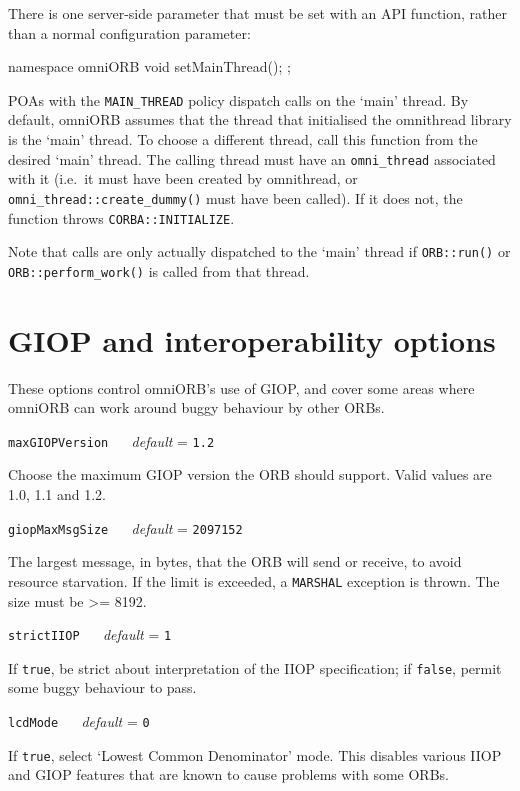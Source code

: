 \documentclass[11pt,oneside,a4paper]{book}
\makeatletter
\newcommand{\code}[1]{\texttt{#1}}
\newcommand{\op}[1]{\texttt{#1()}}
\newcommand{\confopt}[2]
  {\vspace{\baselineskip}\par\noindent\code{#1} ~~ \textit{default} =
   \code{#2}}
\renewcommand{\confopt}[2]
  {\vspace{\baselineskip}\par\noindent\code{#1} ~~ \textit{default} =
   \code{#2}\\[-1ex]\@afterheading}
\newcommand{\dsc}{\discretionary{}{}{}}
\makeatother
\begin{document}
There is one server-side parameter that must be set with an API
function, rather than a normal configuration parameter:

\begin{cxxlisting}
namespace omniORB {
  void setMainThread();
};
\end{cxxlisting}

\noindent
POAs with the \code{MAIN\_THREAD} policy dispatch calls on the `main'
thread.  By default, omniORB assumes that the thread that initialised
the omnithread library is the `main' thread. To choose a different
thread, call this function from the desired `main' thread. The calling
thread must have an \code{omni\_thread} associated with it (i.e.\ it
must have been created by omnithread, or
\op{omni\_thread::create\_\dsc{}dummy} must have been called). If it
does not, the function throws \code{CORBA::\dsc{}INITIALIZE}.
                                                                  
Note that calls are only actually dispatched to the `main' thread if
\op{ORB::run} or \op{ORB::perform\_work} is called from that thread.




\section{GIOP and interoperability options}

These options control omniORB's use of GIOP, and cover some areas
where omniORB can work around buggy behaviour by other ORBs.


\confopt{maxGIOPVersion}{1.2}

Choose the maximum GIOP version the ORB should support. Valid values
are 1.0, 1.1 and 1.2.


\confopt{giopMaxMsgSize}{2097152}

The largest message, in bytes, that the ORB will send or receive, to
avoid resource starvation. If the limit is exceeded, a \code{MARSHAL}
exception is thrown. The size must be >= 8192.

\confopt{strictIIOP}{1}

If \code{true}, be strict about interpretation of the IIOP
specification; if \code{false}, permit some buggy behaviour to pass.


\confopt{lcdMode}{0}

If \code{true}, select `Lowest Common Denominator' mode. This disables
various IIOP and GIOP features that are known to cause problems with
some ORBs.
\end{document}
